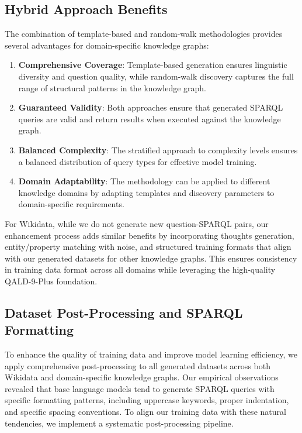 \subsection{Hybrid Approach Benefits}
The combination of template-based and random-walk methodologies provides several advantages for domain-specific knowledge graphs:

\begin{enumerate}
    \item \textbf{Comprehensive Coverage}: Template-based generation ensures linguistic diversity and question quality, while random-walk discovery captures the full range of structural patterns in the knowledge graph.
    
    \item \textbf{Guaranteed Validity}: Both approaches ensure that generated SPARQL queries are valid and return results when executed against the knowledge graph.
    
    \item \textbf{Balanced Complexity}: The stratified approach to complexity levels ensures a balanced distribution of query types for effective model training.
    
    \item \textbf{Domain Adaptability}: The methodology can be applied to different knowledge domains by adapting templates and discovery parameters to domain-specific requirements.
\end{enumerate}

For Wikidata, while we do not generate new question-SPARQL pairs, our enhancement process adds similar benefits by incorporating thoughts generation, entity/property matching with noise, and structured training formats that align with our generated datasets for other knowledge graphs. This ensures consistency in training data format across all domains while leveraging the high-quality QALD-9-Plus foundation.

\subsection{Dataset Post-Processing and SPARQL Formatting}
\label{sec:dataset-postprocessing}

To enhance the quality of training data and improve model learning efficiency, we apply comprehensive post-processing to all generated datasets across both Wikidata and domain-specific knowledge graphs. Our empirical observations revealed that base language models tend to generate SPARQL queries with specific formatting patterns, including uppercase keywords, proper indentation, and specific spacing conventions. To align our training data with these natural tendencies, we implement a systematic post-processing pipeline.

